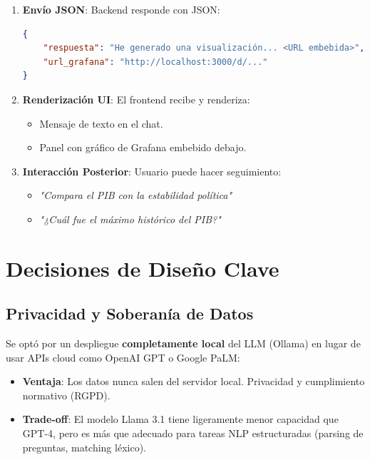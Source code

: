 \documentclass[11pt, a4paper]{report}
\begin{document}
\begin{enumerate}
    \item \textbf{Envío JSON}: Backend responde con JSON:
    \begin{lstlisting}[language=json, caption=Respuesta del backend]
{
    "respuesta": "He generado una visualización... <URL embebida>",
    "url_grafana": "http://localhost:3000/d/..."
}
    \end{lstlisting}
    
    \item \textbf{Renderización UI}: El frontend recibe y renderiza:
    \begin{itemize}
        \item Mensaje de texto en el chat.
        \item Panel con gráfico de Grafana embebido debajo.
    \end{itemize}
    
    \item \textbf{Interacción Posterior}: Usuario puede hacer seguimiento:
    \begin{itemize}
        \item \textit{"Compara el PIB con la estabilidad política"}
        \item \textit{"¿Cuál fue el máximo histórico del PIB?"}
    \end{itemize}
\end{enumerate}

\section{Decisiones de Diseño Clave}

\subsection{Privacidad y Soberanía de Datos}

Se optó por un despliegue \textbf{completamente local} del LLM (Ollama) en lugar de usar APIs cloud como OpenAI GPT o Google PaLM:

\begin{itemize}
    \item \textbf{Ventaja}: Los datos nunca salen del servidor local. Privacidad y cumplimiento normativo (RGPD).
    \item \textbf{Trade-off}: El modelo Llama 3.1 tiene ligeramente menor capacidad que GPT-4, pero es más que adecuado para tareas NLP estructuradas (parsing de preguntas, matching léxico).
\end{itemize}
\end{document}
